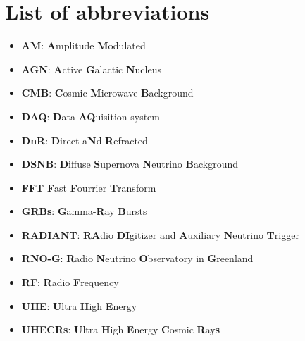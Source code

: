 \appendix
\chapter{List of abbreviations}
\begin{itemize}
\item \textbf{AM}: \textbf{A}mplitude \textbf{M}odulated
\item \textbf{AGN}: \textbf{A}ctive \textbf{G}alactic \textbf{N}ucleus
\item \textbf{CMB}: \textbf{C}osmic \textbf{M}icrowave \textbf{B}ackground
\item \textbf{DAQ}: \textbf{D}ata \textbf{AQ}uisition system
\item \textbf{DnR}: \textbf{D}irect a\textbf{N}d \textbf{R}efracted
\item \textbf{DSNB}: \textbf{D}iffuse \textbf{S}upernova \textbf{N}eutrino \textbf{B}ackground
\item \textbf{FFT} \textbf{F}ast \textbf{F}ourrier \textbf{T}ransform
\item \textbf{GRBs}: \textbf{G}amma-\textbf{R}ay \textbf{B}ursts
\item \textbf{RADIANT}: \textbf{RA}dio \textbf{DI}gitizer and \textbf{A}uxiliary \textbf{N}eutrino \textbf{T}rigger
\item \textbf{RNO-G}: \textbf{R}adio \textbf{N}eutrino \textbf{O}bservatory in \textbf{G}reenland
\item \textbf{RF}: \textbf{R}adio \textbf{F}requency
\item \textbf{UHE}: \textbf{U}ltra \textbf{H}igh \textbf{E}nergy 
\item \textbf{UHECRs}: \textbf{U}ltra \textbf{H}igh \textbf{E}nergy \textbf{C}osmic \textbf{R}ay\textbf{s}
\end{itemize}

